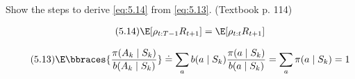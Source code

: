 
\begin{exercise}[Exercise 5.13]

Show the steps to derive \eqref{eq:5.14} from \eqref{eq:5.13}.
(Textbook p. 114)

\end{exercise}


\begin{solution}

\begin{align} \label{eq:5.14} \tag{5.14}
    \E[\rho_{t:T-1} R_{t+1}]
    =
    \E[\rho_{t:t} R_{t+1}]
\end{align}

\begin{align} \label{eq:5.13} \tag{5.13}
    \E
    \bbraces
    {
        \frac{\pi(A_k \mid S_k)}{b(A_k \mid S_k)}
    }
    \doteq
    \sum_a
        b(a \mid S_k)
        \frac{\pi(a \mid S_k)}{b(a \mid S_k)}
    =
    \sum_a
        \pi(a \mid S_k)
    =
    1
\end{align}

\end{solution}

